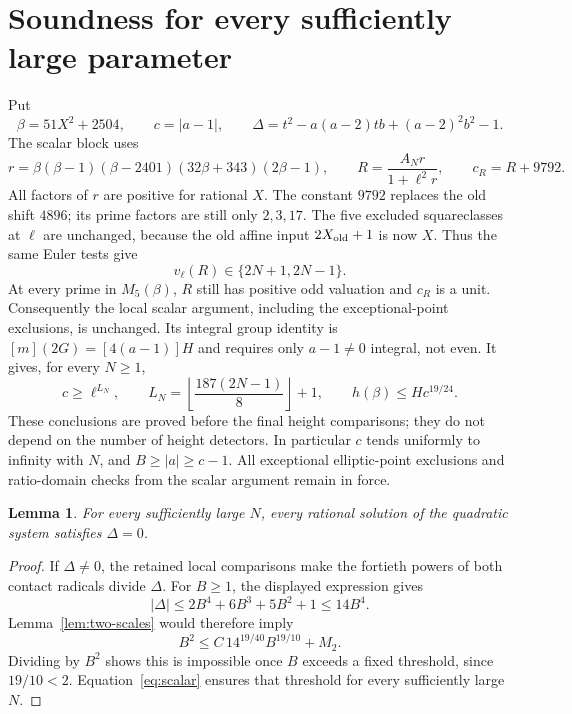 \documentclass[11pt,a4paper]{article}
\newtheorem{lemma}[theorem]{Lemma}
\theoremstyle{remark}\newtheorem{remark}[theorem]{Remark}
\begin{document}
\section{Soundness for every sufficiently large parameter}
Put
\[
 \beta=51X^2+2504,\qquad c=|a-1|,
 \qquad
 \Delta=t^2-a(a-2)tb+(a-2)^2b^2-1.
\]
The scalar block uses
\[
 r=\beta(\beta-1)(\beta-2401)(32\beta+343)(2\beta-1),
 \qquad R=\frac{A_Nr}{1+\ell^2r},\qquad c_R=R+9792.
\]
All factors of $r$ are positive for rational $X$. The constant
$9792$ replaces the old shift $4896$; its prime factors are still
only $2,3,17$. The five excluded squareclasses at $\ell$ are
unchanged, because the old affine input $2X_{\rm old}+1$ is now
$X$. Thus the same Euler tests give
\[
 v_\ell(R)\in\{2N+1,2N-1\}.
\]
At every prime in $M_5(\beta)$, $R$ still has positive odd valuation
and $c_R$ is a unit. Consequently the local scalar argument,
including the exceptional-point exclusions, is unchanged.
Its integral group identity is
$[m](2G)=[4(a-1)]H$ and requires only $a-1\ne0$ integral,
not even. It gives, for every $N\ge1$,
\begin{equation}\label{eq:scalar}
 c\ge\ell^{L_N},\qquad
 L_N=\left\lfloor\frac{187(2N-1)}8\right\rfloor+1,
 \qquad h(\beta)\le Hc^{19/24}.
\end{equation}
These conclusions are proved before the final height comparisons;
they do not depend on the number of height detectors. In particular
$c$ tends uniformly to infinity with $N$, and $B\ge|a|\ge c-1$.
All exceptional elliptic-point exclusions and ratio-domain checks
from the scalar argument remain in force.

\begin{lemma}\label{lem:lucas-residual}
For every sufficiently large $N$, every rational solution of the
quadratic system satisfies $\Delta=0$.
\end{lemma}
\begin{proof}
If $\Delta\ne0$, the retained local comparisons make the fortieth
powers of both contact radicals divide $\Delta$. For $B\ge1$,
the displayed expression gives
\[
 |\Delta|\le2B^4+6B^3+5B^2+1\le14B^4.
\]
Lemma~\ref{lem:two-scales} would therefore imply
\[
 B^2\le C\,14^{19/40}B^{19/10}+M_2.
\]
Dividing by $B^2$ shows this is impossible once $B$ exceeds a
fixed threshold, since $19/10<2$. Equation~\eqref{eq:scalar}
ensures that threshold for every sufficiently large $N$.
\end{proof}
\end{document}
